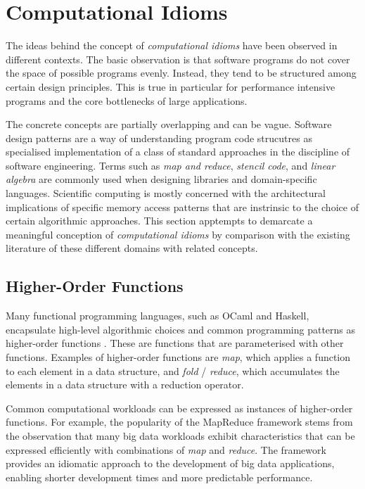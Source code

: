 \section{Computational Idioms}

    The ideas behind the concept of {\it computational idioms} have been
    observed in different contexts.
    The basic observation is that software programs do not cover the
    space of possible programs evenly.
    Instead, they tend to be structured among certain design principles.
    This is true in particular for performance intensive programs and the
    core bottlenecks of large applications.

    The concrete concepts are partially overlapping and can be vague.
    Software design patterns are a way of understanding program code
    strucutres as specialised implementation of a class of standard approaches
    in the discipline of software engineering.
    Terms such as {\em map and reduce}, {\em stencil code}, and
    {\em linear algebra} are commonly used when designing libraries and
    domain-specific languages.
    Scientific computing is mostly concerned with the architectural
    implications of specific memory access patterns that are instrinsic to
    the choice of certain algorithmic approaches.
    This section apptempts to demarcate a meaningful conception of
    {\it computational idioms} by comparison with the existing literature of
    these different domains with related concepts.

\subsection{Higher-Order Functions}

    Many functional programming languages, such as OCaml and Haskell,
    encapsulate high-level algorithmic choices and common programming patterns
    as higher-order functions \citep{Hughes:1989:WFP:63410.63411}.
    These are functions that are parameterised with other functions.
    Examples of higher-order functions are {\it map}, which applies a function
    to each element in a data structure, and {\it fold} / {\it reduce}, which
    accumulates the elements in a data structure with a reduction operator.

    Common computational workloads can be expressed as instances of
    higher-order functions.
    For example, the popularity of the MapReduce framework
    \citep{Dean2008MapReduce} stems from the observation that many big data
    workloads exhibit characteristics that can be expressed efficiently with
    combinations of {\it map} and {\it reduce}.
    The framework provides an idiomatic approach to the development of big
    data applications, enabling shorter development times and more predictable
    performance.

